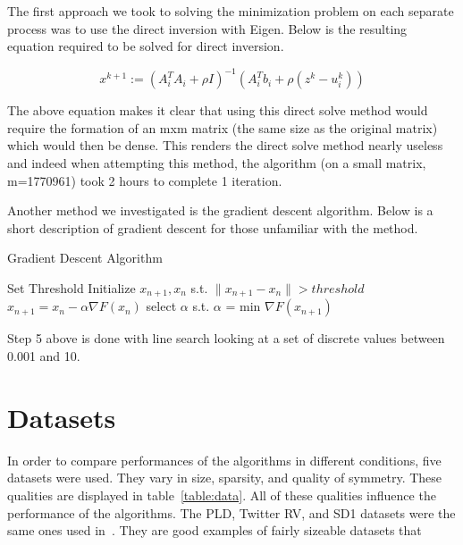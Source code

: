 \documentclass[letterpaper,11pt,onecolumn]{article}
\begin{document}
The first approach we took to solving the minimization problem on each separate process was to use the direct inversion with Eigen. Below is the resulting equation required to be solved for direct inversion.

\begin{center}
  \begin{equation}
	x^{k+1} := (A_{i}^{T}A_{i} + \rho I)^{-1}(A_{i}^{T}b_{i} + \rho(z^{k} - u_{i}^{k}))
	\label{}
  \end{equation}
\end{center}

The above equation makes it clear that using this direct solve method would require the formation of an mxm matrix (the same size as the original matrix) which would then be dense. This renders the direct solve method nearly useless and indeed when attempting this method, the algorithm (on a small matrix, m=1770961) took 2 hours to complete 1 iteration.


Another method we investigated is the gradient descent algorithm. Below is a short description of gradient descent for those unfamiliar with the method.

\begin{center}
  \begin{algorithm}
	\caption{Gradient Descent Algorithm}
	\begin{algorithmic}[1]
	  \STATE Set Threshold
	  \STATE Initialize $x_{n+1}, x_{n}$ s.t. $\|x_{n+1} - x_{n}\| > threshold$
	  \STATE $x_{n+1} = x_{n} - \alpha \nabla F(x_{n})$
	  \STATE select $\alpha$  s.t. $\alpha$ = min $\nabla F(x_{n+1})$
	  \ENDWHILE
	\end{algorithmic}
  \end{algorithm}
\end{center}
Step 5 above is done with line search looking at a set of discrete values between 0.001 and 10.


\section{Datasets}
In order to compare performances of the algorithms in different conditions, five datasets were used. They vary in size, sparsity, and quality of symmetry. These qualities are displayed in table~\ref{table:data}. All of these qualities influence the performance of the algorithms. The PLD, Twitter RV, and SD1 datasets were the same ones used in~\cite{Joyce}. They are good examples of fairly sizeable datasets that 
\end{document}
